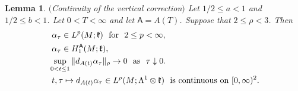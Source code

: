 \documentclass[12pt]{article}
\newtheorem{lemma}[theorem]{Lemma}
\def \L{\Lambda}
\def \As{\mathsf{A}}
\def \kf{\frak k}
\numberwithin{equation}{section}
\begin{document}
\begin{lemma}\label{lemvert6}   $($Continuity of the vertical correction$)$ 
 Let $1/2 \le a < 1$ and $1/2\le b<1$. 
 Let $0 < T < \infty$ and let $\As = A(T)$.
 Suppose that $2 \le \rho <3$.  
 Then  
 \begin{align}
 &\ \alpha_\tau \in  L^p(M; \kf)\ \ \text{for}\ \ 2 \le p <\infty,                     \label{rec713d} \\
 &\ \alpha_\tau \in H_1^\As(M; \kf),      \label{rec713e} \\
 &\sup_{0 < t \le 1} \|d_{A(t)}\alpha_\tau \|_\rho \rightarrow 0\ \ 
                \text{as}\ \ \tau \downarrow 0.                                             \label{rec713c} \\
  &\ t,\tau \mapsto d_{A(t)} \alpha_\tau\in  L^\rho(M; \L^1\otimes \kf)  \ \ 
                     \text{is continuous on}\  [0,\infty)^2.                     \label{rec713ab} 
 \end{align}
 \end{lemma} 
\end{document}
